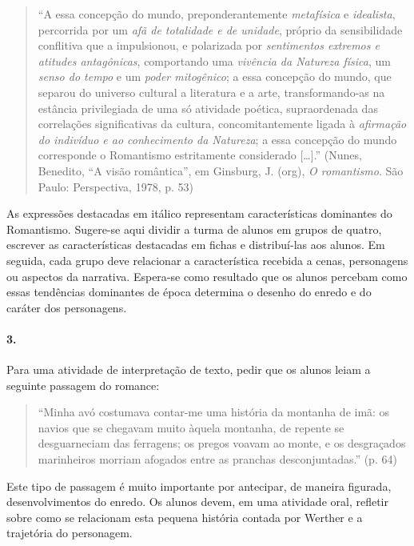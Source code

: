 \documentclass[11pt]{hedrabook}
\begin{document}
\begin{quote}
  “A essa concepção do mundo, preponderantemente \textit{metafísica} e
  \textit{idealista}, percorrida por um \textit{afã de totalidade e de
  unidade}, próprio da sensibilidade conflitiva que a impulsionou, e
  polarizada por \textit{sentimentos extremos e atitudes antagônicas},
  comportando uma \textit{vivência da Natureza física}, um \textit{senso
  do tempo} e um \textit{poder mitogênico}; a essa concepção do mundo,
  que separou do universo cultural a literatura e a arte,
  transformando-as na estância privilegiada de uma só atividade poética,
  supraordenada das correlações significativas da cultura,
  concomitantemente ligada à \textit{afirmação do indivíduo e ao
  conhecimento da Natureza}; a essa concepção do mundo corresponde o
  Romantismo estritamente considerado […].” (Nunes, Benedito, “A visão
  romântica”, em Ginsburg, J. (org), \textit{O romantismo}. São Paulo:
  Perspectiva, 1978, p. 53) 
\end{quote}

As expressões destacadas em itálico representam características
dominantes do Romantismo. Sugere-se aqui dividir a turma de alunos em
grupos de quatro, escrever as características destacadas em fichas e
distribuí-las aos alunos. Em seguida, cada grupo deve relacionar a
característica recebida a cenas, personagens ou aspectos da narrativa.
Espera-se como resultado que os alunos percebam como essas tendências
dominantes de época determina o desenho do enredo e do caráter dos
personagens. 

\paragraph{3.}

Para uma atividade de interpretação de texto, pedir que os alunos
leiam a seguinte passagem do romance:

\begin{quote}
  “Minha avó costumava contar-me uma história da montanha de imã: os
  navios que se chegavam muito àquela montanha, de repente se
  desguarneciam das ferragens; os pregos voavam ao monte, e os
  desgraçados marinheiros morriam afogados entre as pranchas
  desconjuntadas.” (p. 64)
\end{quote}

Este tipo de passagem é muito importante por antecipar, de maneira
figurada, desenvolvimentos do enredo. Os alunos devem, em uma atividade
oral, refletir sobre como se relacionam esta pequena história contada
por Werther e a trajetória do personagem. 
\end{document}
